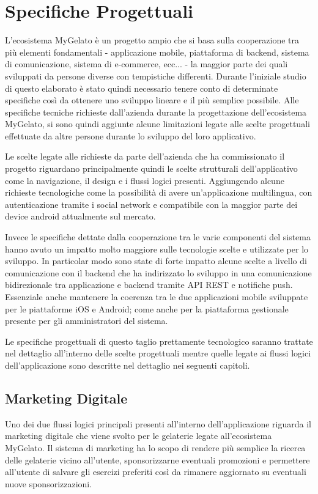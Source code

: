 \section{Specifiche Progettuali}
L'ecosistema MyGelato è un progetto ampio che si basa sulla cooperazione tra più elementi fondamentali - applicazione mobile, piattaforma di backend, sistema di comunicazione, sistema di e-commerce, ecc... - la maggior parte dei quali sviluppati da persone diverse con tempistiche differenti.
Durante l'iniziale studio di questo elaborato è stato quindi necessario tenere conto di determinate specifiche così da ottenere uno sviluppo lineare e il più semplice possibile.
Alle specifiche tecniche richieste dall'azienda durante la progettazione dell'ecosistema MyGelato, si sono quindi aggiunte alcune limitazioni legate alle scelte progettuali effettuate da altre persone durante lo sviluppo del loro applicativo.

Le scelte legate alle richieste da parte dell'azienda che ha commissionato il progetto riguardano principalmente quindi le scelte strutturali dell'applicativo come la navigazione, il design e i flussi logici presenti.
Aggiungendo alcune richieste tecnologiche come la possibilità di avere un'applicazione multilingua, con autenticazione tramite i social network e compatibile con la maggior parte dei device android attualmente sul mercato.

Invece le specifiche dettate dalla cooperazione tra le varie componenti del sistema hanno avuto un impatto molto maggiore sulle tecnologie scelte e utilizzate per lo sviluppo.
In particolar modo sono state di forte impatto alcune scelte a livello di comunicazione con il backend che ha indirizzato lo sviluppo in una comunicazione bidirezionale tra applicazione e backend tramite API REST e notifiche push.
Essenziale anche mantenere la coerenza tra le due applicazioni mobile sviluppate per le piattaforme iOS e Android; come anche per la piattaforma gestionale presente per gli amministratori del sistema.

Le specifiche progettuali di questo taglio prettamente tecnologico saranno trattate nel dettaglio all'interno delle scelte progettuali mentre quelle legate ai flussi logici dell'applicazione sono descritte nel dettaglio nei seguenti capitoli.

\subsection{Marketing Digitale}
Uno dei due flussi logici principali presenti all'interno dell'applicazione riguarda il marketing digitale che viene svolto per le gelaterie legate all'ecosistema MyGelato.
Il sistema di marketing ha lo scopo di rendere più semplice la ricerca delle gelaterie vicino all'utente, sponsorizzarne eventuali promozioni e permettere all'utente di salvare gli esercizi preferiti così da rimanere aggiornato su eventuali nuove sponsorizzazioni.

